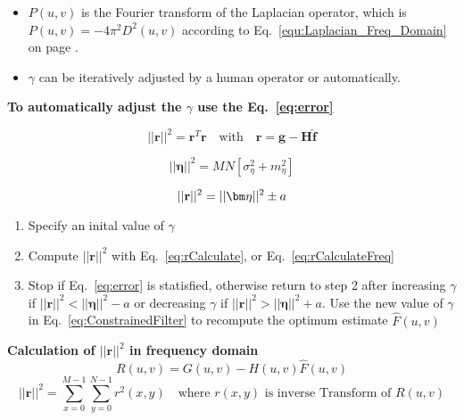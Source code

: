 \begin{itemize}
	\item $P(u,v)$ is the Fourier transform of the Laplacian operator, which is $P(u,v) = -4\pi^2D^2(u,v)$ according to Eq.~\ref{equ:Laplacian_Freq_Domain} on page \pageref{equ:Laplacian_Freq_Domain}.
	\item $\gamma$ can be iteratively adjusted by a human operator or automatically.
\end{itemize}

\textbf{To automatically adjust the $\gamma$ use the Eq.~\ref{eq:error}}

\begin{equation}
	||\mathbf{r}||^{2} = \mathbf{r}^{T}\mathbf{r} \quad \textrm{with} \quad\mathbf{r} = \mathbf{g}-\mathbf{H} \mathbf{\hat{f}}
	\label{eq:rCalculate}
\end{equation}

\begin{equation}
	||\bm\eta||^2= MN[\sigma_{\eta}^2 + m_{\eta}^2]
\end{equation}

\begin{equation}
	||\mathbf{r}||^2 = ||\bm\eta||^2 \pm a
	\label{eq:error}\\
\end{equation}
\begin{enumerate}
	\item Specify an inital value of $\gamma$
	\item Compute $||\mathbf{r}||^2$ with Eq.~\ref{eq:rCalculate}, or  Eq.~\ref{eq:rCalculateFreq}
	\item Stop if Eq.~\ref{eq:error} is statisfied, otherwise return to step 2 after increasing $\gamma$ if $||\mathbf{r}||^2 < ||\bm\eta||^2-a$ or  decreasing $\gamma$ if  $||\mathbf{r}||^2 > ||\bm\eta||^2+a$. Use the new value of $\gamma$ in Eq.~\ref{eq:ConstrainedFilter} to recompute the optimum estimate $\hat{F}(u,v)$
\end{enumerate}

\textbf{Calculation of $||\mathbf{r}||^2$ in frequency domain}
	\begin{equation}
		R(u,v) = G(u,v) - H(u,v)\hat{F}(u,v)
	\end{equation}
	\begin{equation}
		||\mathbf{r}||^2 = \sum\limits_{x=0}^{M-1} \sum\limits_{y=0}^{N-1} r^{2}(x,y) \quad \textrm{where } r(x,y) \textrm{ is inverse Transform of } R(u,v)
		\label{eq:rCalculateFreq}
	\end{equation}

